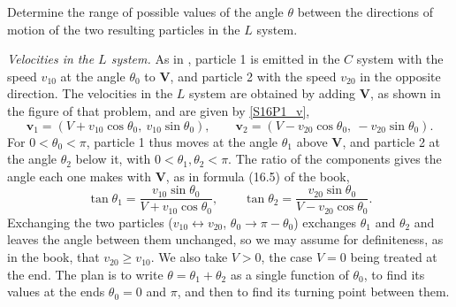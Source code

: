 \begin{problem}[title={Range of angles between two decay products}]
{
Determine the range of possible values of the angle $\theta$ between the directions of motion of the two resulting particles in the $L$ system.
}
{
\textit{Velocities in the $L$ system.} As in , particle 1 is emitted in the $C$ system with the speed $v_{10}$ at the angle $\theta_0$ to $\mathbf{V}$, and particle 2 with the speed $v_{20}$ in the opposite direction. The velocities in the $L$ system are obtained by adding $\mathbf{V}$, as shown in the figure of that problem, and are given by \eqref{S16P1_v},
\begin{equation*}
    \mathbf{v}_1 = \left( V + v_{10}\cos{\theta_0},\ v_{10}\sin{\theta_0} \right), \qquad
    \mathbf{v}_2 = \left( V - v_{20}\cos{\theta_0},\ -v_{20}\sin{\theta_0} \right).
\end{equation*}
For $0<\theta_0<\pi$, particle 1 thus moves at the angle $\theta_1$ above $\mathbf{V}$, and particle 2 at the angle $\theta_2$ below it, with $0<\theta_1,\theta_2<\pi$. The ratio of the components gives the angle each one makes with $\mathbf{V}$, as in formula (16.5) of the book,
\begin{equation*}
    \tan{\theta_1} = \frac{v_{10}\sin{\theta_0}}{V+v_{10}\cos{\theta_0}}, \qquad
    \tan{\theta_2} = \frac{v_{20}\sin{\theta_0}}{V-v_{20}\cos{\theta_0}}.
\end{equation*}
Exchanging the two particles ($v_{10} \leftrightarrow v_{20}$, $\theta_0 \rightarrow \pi-\theta_0$) exchanges $\theta_1$ and $\theta_2$ and leaves the angle between them unchanged, so we may assume for definiteness, as in the book, that $v_{20} \geq v_{10}$. We also take $V>0$, the case $V=0$ being treated at the end. The plan is to write $\theta = \theta_1+\theta_2$ as a single function of $\theta_0$, to find its values at the ends $\theta_0 = 0$ and $\pi$, and then to find its turning point between them.

}
\end{problem}
